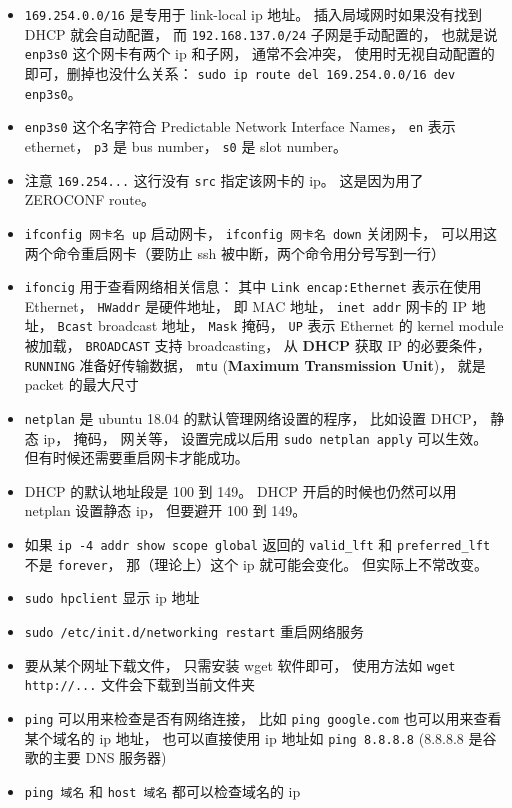 \begin{itemize}
\item \verb`169.254.0.0/16` 是专用于 link-local ip 地址。 插入局域网时如果没有找到 DHCP 就会自动配置， 而 \verb`192.168.137.0/24` 子网是手动配置的， 也就是说 \verb`enp3s0` 这个网卡有两个 ip 和子网， 通常不会冲突， 使用时无视自动配置的即可，删掉也没什么关系： \verb`sudo ip route del 169.254.0.0/16 dev enp3s0`。
\item \verb`enp3s0` 这个名字符合 Predictable Network Interface Names， \verb`en` 表示 ethernet， \verb`p3` 是 bus number， \verb`s0` 是 slot number。
\item 注意 \verb`169.254...` 这行没有 \verb`src` 指定该网卡的 ip。 这是因为用了 ZEROCONF route。
\item \verb`ifconfig 网卡名 up` 启动网卡， \verb`ifconfig 网卡名 down` 关闭网卡， 可以用这两个命令重启网卡（要防止 ssh 被中断，两个命令用分号写到一行）
\item \verb`ifoncig` 用于查看网络相关信息： 其中 \verb`Link encap:Ethernet` 表示在使用 Ethernet， \verb`HWaddr` 是硬件地址， 即 MAC 地址， \verb`inet addr` 网卡的 IP 地址， \verb`Bcast` broadcast 地址， \verb`Mask` 掩码， \verb`UP` 表示 Ethernet 的 kernel module 被加载， \verb`BROADCAST` 支持 broadcasting， 从 \textbf{DHCP} 获取 IP 的必要条件， \verb`RUNNING` 准备好传输数据， \verb`mtu` (\textbf{Maximum Transmission Unit})， 就是 packet 的最大尺寸
\item \verb`netplan` 是 ubuntu 18.04 的默认管理网络设置的程序， 比如设置 DHCP， 静态 ip， 掩码， 网关等， 设置完成以后用 \verb`sudo netplan apply` 可以生效。 但有时候还需要重启网卡才能成功。
\item DHCP 的默认地址段是 100 到 149。 DHCP 开启的时候也仍然可以用 netplan 设置静态 ip， 但要避开 100 到 149。
\item 如果 \verb|ip -4 addr show scope global| 返回的 \verb|valid_lft| 和 \verb|preferred_lft| 不是 \verb|forever|， 那（理论上）这个 ip 就可能会变化。 但实际上不常改变。
\item \verb`sudo hpclient` 显示 ip 地址
\item \verb`sudo /etc/init.d/networking restart` 重启网络服务 
\item 要从某个网址下载文件， 只需安装 wget 软件即可， 使用方法如 \verb`wget http://...` 文件会下载到当前文件夹
\item \verb`ping` 可以用来检查是否有网络连接， 比如 \verb`ping google.com` 也可以用来查看某个域名的 ip 地址， 也可以直接使用 ip 地址如 \verb`ping 8.8.8.8` (8.8.8.8 是谷歌的主要 DNS 服务器)
\item \verb`ping 域名` 和 \verb|host 域名| 都可以检查域名的 ip

\end{itemize}
